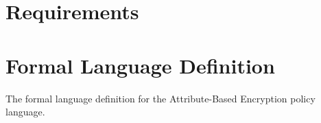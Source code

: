 \section{Requirements}
\label{sec:design_reqs}



\section{Formal Language Definition}
\label{sec:formal_lang}
The formal language definition for the Attribute-Based Encryption policy language.










